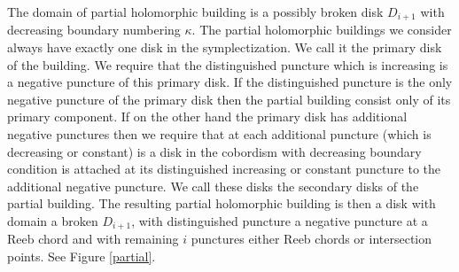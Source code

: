 \documentclass{gtpart}
\begin{document}
The domain of partial holomorphic building is a possibly broken disk $D_{i+1}$ with decreasing
boundary numbering $\kappa$. The partial holomorphic buildings we consider always have exactly one
disk in the symplectization. We call it the primary disk of the building. We require that the
distinguished puncture which is increasing is a negative puncture of this primary disk. If the
distinguished puncture is the only negative puncture of the primary disk  then the partial building
consist only of its primary component. If on the other hand the primary disk has additional negative
punctures then we require that at each additional puncture (which is decreasing or constant) is a
disk in the cobordism with decreasing boundary condition is attached at its distinguished increasing
or constant puncture to the additional negative puncture. We call these disks the secondary disks of
the partial building. The resulting partial holomorphic building is then a disk with domain a broken
$D_{i+1}$, with distinguished puncture a negative puncture at a Reeb chord and with remaining $i$
punctures either Reeb chords or intersection points. See Figure \ref{partial}.
\end{document}
